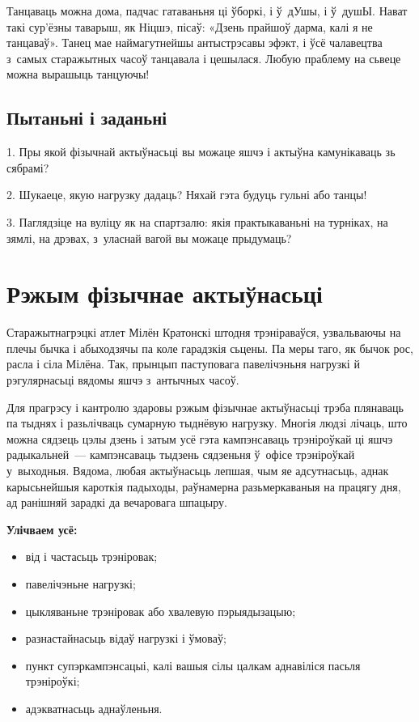 Танцаваць можна дома, падчас гатаваньня ці ўборкі, і ў~дУшы, і ў~душЫ. Нават такі сур'ёзны таварыш, як Ніцшэ, пісаў: «Дзень прайшоў дарма, калі я не танцаваў». Танец мае наймагутнейшы антыстрэсавы эфэкт, і ўсё чалавецтва з~самых старажытных часоў танцавала і цешылася. Любую праблему на сьвеце можна вырашыць танцуючы!

\subsection*{Пытаньні і заданьні}

1. Пры якой фізычнай актыўнасьці вы можаце яшчэ і актыўна камунікаваць зь сябрамі?

2. Шукаеце, якую нагрузку дадаць? Няхай гэта будуць гульні або танцы!

3. Паглядзіце на вуліцу як на спартзалю: якія практыкаваньні на турніках, на зямлі, на дрэвах, з~уласнай вагой вы можаце прыдумаць?


\section{Рэжым фізычнае актыўнасьці}

Старажытнагрэцкі атлет Мілён Кратонскі штодня трэніраваўся, узвальваючы на плечы бычка і абыходзячы па коле гарадзкія сьцены. Па меры таго, як бычок рос, расла і сіла Мілёна. Так, прынцып паступовага павелічэньня нагрузкі й рэгулярнасьці вядомы яшчэ з~антычных часоў.

Для прагрэсу і кантролю здаровы рэжым фізычнае актыўнасьці трэба плянаваць па тыднях і разьлічваць сумарную тыднёвую нагрузку. Многія людзі лічаць, што можна сядзець цэлы дзень і затым усё гэта кампэнсаваць трэніроўкай ці яшчэ радыкальней~--- кампэнсаваць тыдзень сядзеньня ў~офісе трэніроўкай у~выходныя. Вядома, любая актыўнасьць лепшая, чым яе адсутнасьць, аднак карысьнейшыя кароткія падыходы, раўнамерна разьмеркаваныя на працягу дня, ад ранішняй зарадкі да вечаровага шпацыру.

\textbf{Улічваем усё:}
\begin{itemize}
  \item від і частасьць трэніровак; 
  \item павелічэньне нагрузкі; 
  \item цыкляваньне трэніровак або хвалевую пэрыядызацыю; 
  \item разнастайнасьць відаў нагрузкі і ўмоваў; 
  \item пункт супэркампэнсацыі, калі вашыя сілы цалкам аднавіліся пасьля трэніроўкі;
  \item адэкватнасьць аднаўленьня.
\end{itemize}

